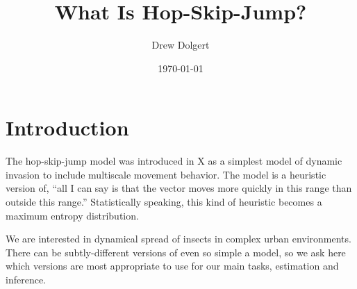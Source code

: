 \documentclass{article}
\title{What Is Hop-Skip-Jump?}
\author{Drew Dolgert}
\date{\today}
\begin{document}
\maketitle

\section{Introduction}
The hop-skip-jump model was introduced in X as a simplest model
of dynamic invasion to include multiscale movement behavior.
The model is a heuristic version of, ``all I can say is that the
vector moves more quickly in this range than outside this range.''
Statistically speaking, this kind of heuristic becomes a
maximum entropy distribution.

We are interested in dynamical spread of insects in complex
urban environments. There can be subtly-different versions of
even so simple a model, so we ask here which versions are
most appropriate to use for our main tasks, estimation and
inference.
\end{document}
